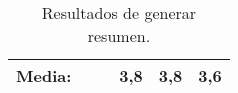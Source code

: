 \begin{table}[H]
{\begin{tabular}{c|ccccc|}
            \multicolumn{1}{|c|}{\textbf{Media:}}    & \multicolumn{1}{c|}{}                                                                                               & \multicolumn{1}{c|}{}                                                                                                                                                       & \multicolumn{1}{c|}{\textbf{3,8}}                                                                                                                                                     & \multicolumn{1}{c|}{\textbf{3,8}}                                                                                                                                                                              & \textbf{3,6}                                                                                                                                                                                                                  \\ \hline
        \end{tabular}
    }
    \caption{Resultados de generar resumen.}
    \label{tab:resultadosResumen}
\end{table}

